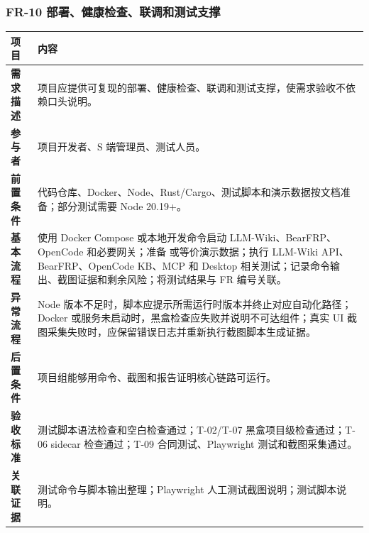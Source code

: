 \documentclass[UTF8,a4paper,12pt,fontset=fandol]{ctexart}
\newcommand{\code}[1]{\texorpdfstring{\begingroup\footnotesize\detokenize{#1}\endgroup}{#1}}
\begin{document}
\subsubsection{FR-10 部署、健康检查、联调和测试支撑}
\begin{longtable}{>{\bfseries}p{2.4cm}p{11.8cm}}
\toprule
项目 & 内容 \\
\midrule
需求描述 & 项目应提供可复现的部署、健康检查、联调和测试支撑，使需求验收不依赖口头说明。 \\
参与者 & 项目开发者、S 端管理员、测试人员。 \\
前置条件 & 代码仓库、Docker、Node、Rust/Cargo、测试脚本和演示数据按文档准备；部分测试需要 Node 20.19+。 \\
基本流程 & 使用 Docker Compose 或本地开发命令启动 LLM-Wiki、BearFRP、OpenCode 和必要网关；准备 \code{sample-wiki} 或等价演示数据；执行 LLM-Wiki API、BearFRP、OpenCode KB、MCP 和 Desktop 相关测试；记录命令输出、截图证据和剩余风险；将测试结果与 FR 编号关联。 \\
异常流程 & Node 版本不足时，脚本应提示所需运行时版本并终止对应自动化路径；Docker 或服务未启动时，黑盒检查应失败并说明不可达组件；真实 UI 截图采集失败时，应保留错误日志并重新执行截图脚本生成证据。 \\
后置条件 & 项目组能够用命令、截图和报告证明核心链路可运行。 \\
验收标准 & 测试脚本语法检查和空白检查通过；T-02/T-07 黑盒项目级检查通过；T-06 sidecar 检查通过；T-09 合同测试、Playwright 测试和截图采集通过。 \\
关联证据 & 测试命令与脚本输出整理；Playwright 人工测试截图说明；测试脚本说明。 \\
\bottomrule
\end{longtable}
\end{document}
